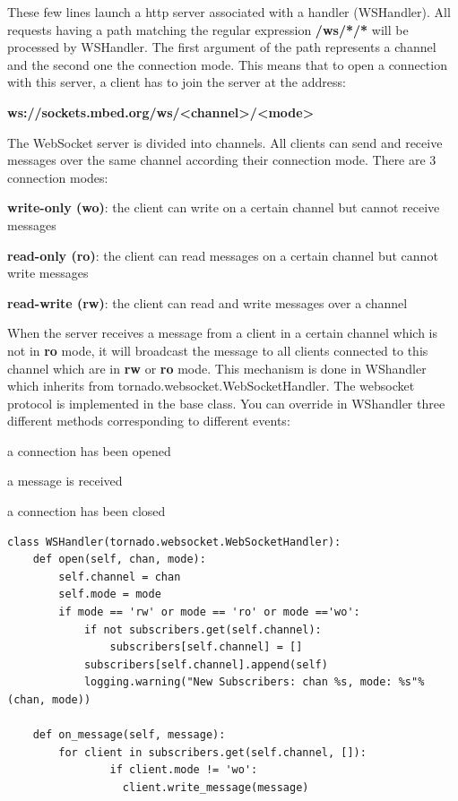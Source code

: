 \documentclass[pdftex,10pt,a4paper]{report}
\newenvironment{packed_item}{
\begin{itemize}
  \setlength{\itemsep}{1pt}
  \setlength{\parskip}{0pt}
  \setlength{\parsep}{0pt}
}{\end{itemize}}
\begin{document}
These few lines launch a http server associated with a handler (WSHandler). All requests having a path matching the regular expression \textbf{/ws/*/*} will be processed by WSHandler. The first argument of the path represents a channel and the second one the connection mode. This means that to open a connection with this server, a client has to join the server at the address: 
\begin{center}
\textbf{ws://sockets.mbed.org/ws/\textless{}channel\textgreater{}/\textless{}mode\textgreater{}}
\end{center}

The WebSocket server is divided into channels. All clients can send and receive messages over the same channel according their connection mode.
There are 3 connection modes:

\begin{packed_item}
	\item \textbf{write-only (wo)}: the client can write on a certain channel but cannot receive messages
	\item \textbf{read-only (ro)}: the client can read messages on a certain channel but cannot write messages
	\item \textbf{read-write (rw)}: the client can read and write messages over a channel
\end{packed_item}

When the server receives a message from a client in a certain channel which is not in \textbf{ro} mode, it will broadcast the message to all clients connected to this channel which are in \textbf{rw} or \textbf{ro} mode. This mechanism is done in WShandler which inherits from tornado.websocket.WebSocketHandler. The websocket protocol is implemented in the base class. You can override in WShandler three different methods corresponding to different events: 

\begin{packed_item}
	\item a connection has been opened
	\item a message is received
	\item a connection has been closed
\end{packed_item}

\begin{lstlisting}[label=Broadcast messages received,caption=Broadcast messages received]
class WSHandler(tornado.websocket.WebSocketHandler):
    def open(self, chan, mode):
        self.channel = chan
        self.mode = mode
        if mode == 'rw' or mode == 'ro' or mode =='wo':
            if not subscribers.get(self.channel):
                subscribers[self.channel] = []
            subscribers[self.channel].append(self)	
            logging.warning("New Subscribers: chan %s, mode: %s"%(chan, mode))

    def on_message(self, message):
        for client in subscribers.get(self.channel, []):
        		if client.mode != 'wo':
	              client.write_message(message)
\end{lstlisting}
\end{document}
